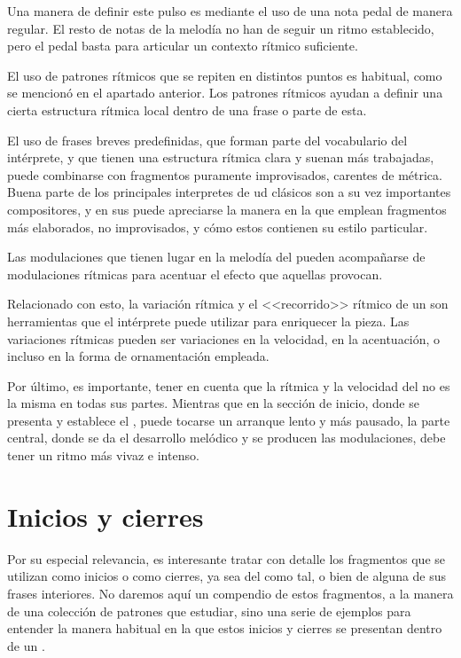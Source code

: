 Una manera de definir este pulso es mediante el uso de una nota pedal de manera regular. El resto de notas de la melodía no han de seguir un ritmo establecido, pero el pedal basta para articular un contexto rítmico suficiente.

El uso de patrones rítmicos que se repiten en distintos puntos es habitual, como se mencionó en el apartado anterior. Los patrones rítmicos ayudan a definir una cierta estructura rítmica local dentro de una frase o parte de esta.

El uso de frases breves predefinidas, que forman parte del vocabulario del intérprete, y que tienen una estructura rítmica clara y suenan más trabajadas, puede combinarse con fragmentos puramente improvisados, carentes de métrica. Buena parte de los principales interpretes de ud clásicos son a su vez importantes compositores, y en sus \taqasim puede apreciarse la manera en la que emplean fragmentos más elaborados, no improvisados, y cómo estos contienen su estilo particular.

Las modulaciones que tienen lugar en la melodía del \taqsim pueden acompañarse de modulaciones rítmicas para acentuar el efecto que aquellas provocan.

Relacionado con esto, la variación rítmica y el <<recorrido>> rítmico de un \taqsim son herramientas que el intérprete puede utilizar para enriquecer la pieza. Las variaciones rítmicas pueden ser variaciones en la velocidad, en la acentuación, o incluso en la forma de ornamentación empleada.

Por último, es importante, tener en cuenta que la rítmica y la velocidad del \taqsim no es la misma en todas sus partes. Mientras que en la sección de inicio, donde se presenta y establece el \maqamb, puede tocarse un arranque lento y más pausado, la parte central, donde se da el desarrollo melódico y se producen las modulaciones, debe tener un ritmo más vivaz e intenso.

\section{Inicios y cierres}

Por su especial relevancia, es interesante tratar con detalle los fragmentos que se utilizan como inicios o como cierres, ya sea del \taqsim como tal, o bien de alguna de sus frases interiores. No daremos aquí un compendio de estos fragmentos, a la manera de una colección de patrones que estudiar, sino una serie de ejemplos para entender la manera habitual en la que estos inicios y cierres se presentan dentro de un \taqsimb.

